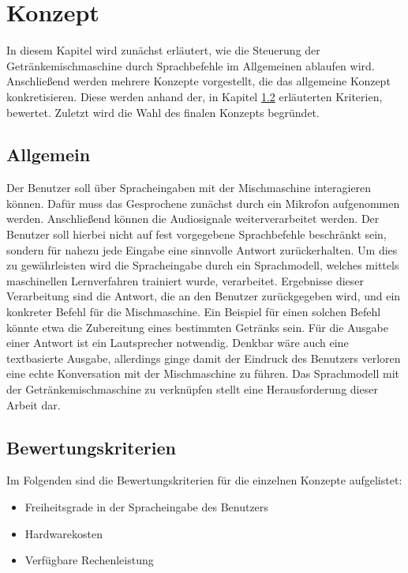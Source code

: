 \chapter{Konzept}
In diesem Kapitel wird zunächst erläutert, wie die Steuerung der Getränkemischmaschine durch Sprachbefehle im Allgemeinen ablaufen wird.
Anschließend werden mehrere Konzepte vorgestellt, die das allgemeine Konzept konkretisieren.
Diese werden anhand der, in Kapitel \ref{section:Bewertungskriterien} erläuterten Kriterien, bewertet.
Zuletzt wird die Wahl des finalen Konzepts begründet.
\section{Allgemein}
Der Benutzer soll über Spracheingaben mit der Mischmaschine interagieren können.
Dafür muss das Gesprochene zunächst durch ein Mikrofon aufgenommen werden.
Anschließend können die Audiosignale weiterverarbeitet werden.
Der Benutzer soll hierbei nicht auf fest vorgegebene Sprachbefehle beschränkt sein, sondern für nahezu jede Eingabe eine sinnvolle Antwort zurückerhalten.
Um dies zu gewährleisten wird die Spracheingabe durch ein Sprachmodell, welches mittels maschinellen Lernverfahren trainiert wurde, verarbeitet.
Ergebnisse dieser Verarbeitung sind die Antwort, die an den Benutzer zurückgegeben wird, und ein konkreter Befehl für die Mischmaschine.
Ein Beispiel für einen solchen Befehl könnte etwa die Zubereitung eines bestimmten Getränks sein.
Für die Ausgabe einer Antwort ist ein Lautsprecher notwendig.
Denkbar wäre auch eine textbasierte Ausgabe, allerdings ginge damit der Eindruck des Benutzers verloren eine echte Konversation mit der Mischmaschine zu führen.
Das Sprachmodell mit der Getränkemischmaschine zu verknüpfen stellt eine Herausforderung dieser Arbeit dar.
\section{Bewertungskriterien} \label{section:Bewertungskriterien}
Im Folgenden sind die Bewertungskriterien für die einzelnen Konzepte aufgelistet:
\begin{itemize}
    \item Freiheitsgrade in der Spracheingabe des Benutzers
    \item Hardwarekosten
    \item Verfügbare Rechenleistung
\end{itemize}

